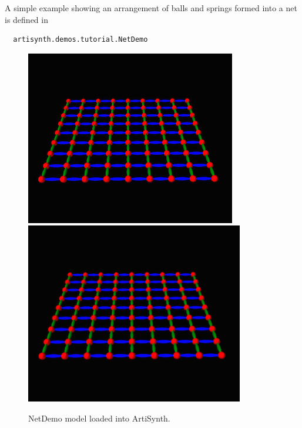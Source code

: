 A simple example showing an arrangement of balls and springs formed into
a net is defined in
%
\begin{verbatim}
  artisynth.demos.tutorial.NetDemo
\end{verbatim}
%

\begin{figure}[ht]
\begin{center}
\iflatexml
 \includegraphics[]{images/NetDemo}
\else
 \includegraphics[width=3.75in]{images/NetDemo}
\fi
\end{center}
\caption{NetDemo model loaded into ArtiSynth.}
\label{NetDemo:fig}
\end{figure}


